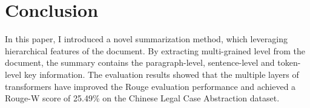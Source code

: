 \documentclass[11pt,a4paper]{article}
\begin{document}
\section{Conclusion}

In this paper, I introduced a novel summarization method, which leveraging hierarchical features of the document.
By extracting multi-grained level from the document, the summary contains the paragraph-level, sentence-level and token-level key information.
The evaluation results showed that the multiple layers of transformers have improved the Rouge evaluation performance
and achieved a Rouge-W score of 25.49\% on the Chinese Legal Case Abstraction dataset.




\end{document}
